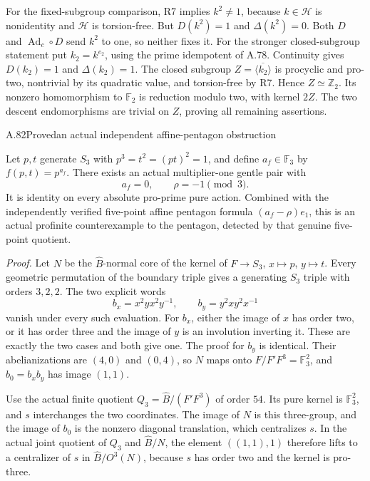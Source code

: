 For the fixed-subgroup comparison, R7 implies $k^2\ne1$,
because $k\in\mathcal H$ is nonidentity and $\mathcal H$ is
torsion-free. But $D(k^2)=1$ and $\Delta(k^2)=0$.
Both $D$ and $\operatorname{Ad}_c\circ D$ send $k^2$ to one,
so neither fixes it. For the stronger closed-subgroup statement
put $k_2=k^{e_2}$, using the prime idempotent of A.78.
Continuity gives $D(k_2)=1$ and $\Delta(k_2)=1$.
The closed subgroup $Z=\overline{\langle k_2\rangle}$ is
procyclic and pro-two, nontrivial by its quadratic value, and
torsion-free by R7. Hence $Z\simeq\mathbb Z_2$.
Its nonzero homomorphism to $\mathbb F_2$ is reduction modulo
two, with kernel $2Z$. The two descent endomorphisms are
trivial on $Z$, proving all remaining assertions.

\begin{statement}{A.82}{Proved}{an actual independent affine-pentagon obstruction}
\end{statement}
Let $p,t$ generate $S_3$ with $p^3=t^2=(pt)^2=1$, and define
$a_f\in\mathbb F_3$ by $f(p,t)=p^{a_f}$.
There exists an actual multiplier-one gentle pair with
\[
                  a_f=0,\qquad \rho=-1\pmod3.
\]
It is identity on every absolute pro-prime pure action. Combined
with the independently verified five-point affine pentagon formula
$(a_f-\rho)e_1$, this is an actual profinite counterexample to the
pentagon, detected by that genuine five-point quotient.

\emph{Proof.}
Let $N$ be the $\widehat B$-normal core of the kernel of
$F\to S_3$, $x\mapsto p$, $y\mapsto t$. Every geometric
permutation of the boundary triple gives a generating $S_3$
triple with orders $3,2,2$. The two explicit words
\[
 b_x=x^2yx^2y^{-1},\qquad b_y=y^2xy^2x^{-1}
\]
vanish under every such evaluation. For $b_x$, either the image
of $x$ has order two, or it has order three and the image of $y$
is an involution inverting it. These are exactly the two cases
and both give one. The proof for $b_y$ is identical. Their
abelianizations are $(4,0)$ and $(0,4)$, so $N$ maps onto
$F/F'F^3=\mathbb F_3^2$, and $b_0=b_xb_y$ has image $(1,1)$.

Use the actual finite quotient $Q_3=\widehat B/(F'F^3)$ of
order $54$. Its pure kernel is $\mathbb F_3^2$, and $s$
interchanges the two coordinates. The image of $N$ is this
three-group, and the image of $b_0$ is the nonzero diagonal
translation, which centralizes $s$.
In the actual joint quotient of $Q_3$ and $\widehat B/N$,
the element $((1,1),1)$ therefore lifts to a centralizer of $s$
in $\widehat B/O^3(N)$, because $s$ has order two and the
kernel is pro-three.

